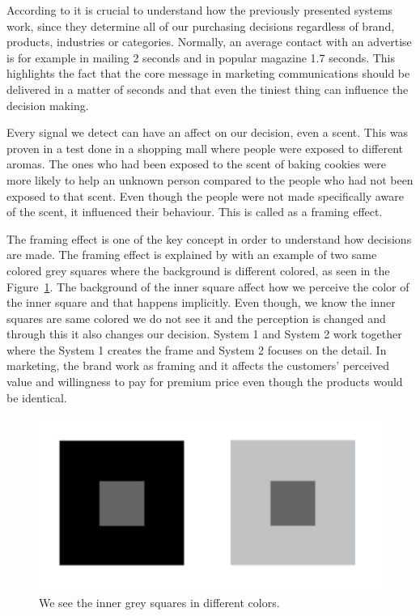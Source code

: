 According to \textcite{Decoded:2013} it is crucial to understand how the previously presented systems work, since they determine all of our purchasing decisions regardless of brand, products, industries or categories. Normally, an average contact with an advertise is for example in mailing 2 seconds and in popular magazine 1.7 seconds. This highlights the fact that the core message in marketing communications should be delivered in a matter of seconds and that even the tiniest thing can influence the decision making.

Every signal we detect can have an affect on our decision, even a scent. This was proven in a test done in a shopping mall where people were exposed to different aromas. The ones who had been exposed to the scent of baking cookies were more likely to help an unknown person compared to the people who had not been exposed to that scent. Even though the people were not made specifically aware of the scent, it influenced their behaviour. This is called as a framing effect. \parencite{Decoded:2013}

The framing effect is one of the key concept in order to understand how decisions are made. The framing effect is explained by \textcite{Decoded:2013} with an example of two same colored grey squares where the background is different colored, as seen in the Figure~\ref{fig:squares}. The background of the inner square affect how we perceive the color of the inner square and that happens implicitly. Even though, we know the inner squares are same colored we do not see it and the perception is changed and through this it also changes our decision. System 1 and System 2 work together where the System 1 creates the frame and System 2 focuses on the detail. In marketing, the brand work as framing and it affects the customers' perceived value and willingness to pay for premium price even though the products would be identical. \parencite{Decoded:2013}

\begin{figure}[ht]
  \begin{center}
    \includegraphics[scale=2, width=\textwidth]{dippa/images/squares.png}
    \caption{We see the inner grey squares in different colors.}
    \label{fig:squares}
  \end{center}
\end{figure}

